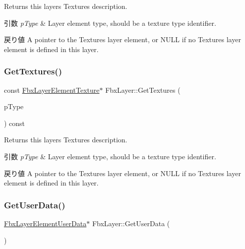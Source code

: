 Returns this layer\textquotesingle{}s Textures description. 
\begin{DoxyParams}{引数}
{\em p\+Type} & Layer element type, should be a texture type identifier. \\
\hline
\end{DoxyParams}
\begin{DoxyReturn}{戻り値}
A pointer to the Textures layer element, or {\ttfamily N\+U\+LL} if no Textures layer element is defined in this layer. 
\end{DoxyReturn}
\mbox{\label{class_fbx_layer_a2e5276f58eacbf3c03ea334581db1fc5}} 
\subsubsection{\texorpdfstring{Get\+Textures()}{GetTextures()}\hspace{0.1cm}{\footnotesize\ttfamily [2/2]}}
{\footnotesize\ttfamily const \hyperlink{class_fbx_layer_element_texture}{Fbx\+Layer\+Element\+Texture}$\ast$ Fbx\+Layer\+::\+Get\+Textures (\begin{DoxyParamCaption}\item[{\hyperlink{class_fbx_layer_element_a8c95c5cd880b56c776acd379bd86f42c}{Fbx\+Layer\+Element\+::\+E\+Type}}]{p\+Type }\end{DoxyParamCaption}) const}

Returns this layer\textquotesingle{}s Textures description. 
\begin{DoxyParams}{引数}
{\em p\+Type} & Layer element type, should be a texture type identifier. \\
\hline
\end{DoxyParams}
\begin{DoxyReturn}{戻り値}
A pointer to the Textures layer element, or {\ttfamily N\+U\+LL} if no Textures layer element is defined in this layer. 
\end{DoxyReturn}
\mbox{\label{class_fbx_layer_ac5420149207fd66e6b0e1808ee9b9d79}} 
\subsubsection{\texorpdfstring{Get\+User\+Data()}{GetUserData()}\hspace{0.1cm}{\footnotesize\ttfamily [1/2]}}
{\footnotesize\ttfamily \hyperlink{class_fbx_layer_element_user_data}{Fbx\+Layer\+Element\+User\+Data}$\ast$ Fbx\+Layer\+::\+Get\+User\+Data (\begin{DoxyParamCaption}{ }\end{DoxyParamCaption})}

